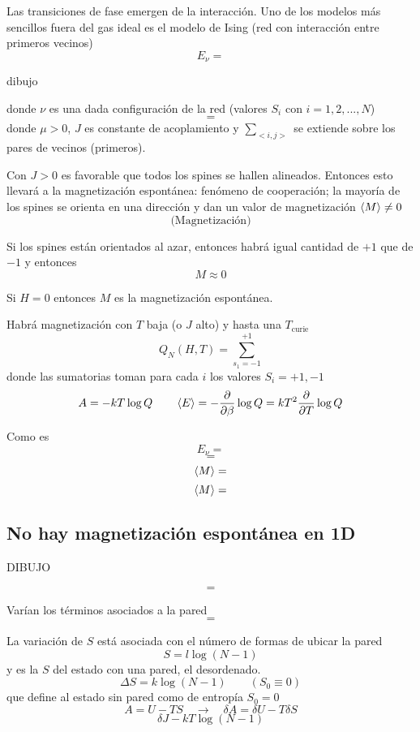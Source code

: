 \documentclass[10pt,oneside]{CBFT_book}
\begin{document}
Las transiciones de fase emergen de la interacción. Uno de los modelos más sencillos fuera del gas ideal es el modelo de
Ising (red con interacción entre primeros vecinos)
\[
	E_\nu =
	\label{energia_ising}
\]

dibujo 

donde $\nu$ es una dada configuración de la red (valores $S_i$ con $i=1,2,...,N$)
\[
	=
\]
donde $\mu>0$, $J$ es constante de acoplamiento y $\sum_{<i,j>}$ se extiende sobre los pares de vecinos (primeros).

Con $J>0$ es favorable que todos los spines se hallen alineados. Entonces esto llevará a la magnetización espontánea: 
fenómeno de cooperación; la mayoría de los spines se orienta en una dirección y dan un valor de magnetización 
$\braket{M} \neq 0$
\[
	\text{ (Magnetización) }
\]

Si los spines están orientados al azar, entonces habrá igual cantidad de $+1$ que de $-1$ y entonces
\[
	M \approx 0
\]

Si $H=0$ entonces $M$ es la magnetización espontánea.

Habrá magnetización con $T$ baja (o $J$ alto) y hasta una $T_\text{curie}$
\[
	Q_N(H,T) = \sum_{s_1=-1}^{+1} 
\]
donde las sumatorias toman para cada $i$ los valores $S_i = +1, -1$
\[
	A = -kT\log Q \qquad \braket{E} = -\frac{\partial^{\hspace{-0.05em}} {}}{\partial {\beta}^{\hspace{-0.05em}}}\log Q = kT^2 \frac{\partial^{\hspace{-0.05em}} {}}{\partial {T}^{\hspace{-0.05em}}} \log Q
\]

Como es
\[
	E_\nu =
\]
\[
	=
\]
\[
	\braket{M} = 
\]
\[
	\braket{M} = 
\]

\subsection{No hay magnetización espontánea en 1D}

DIBUJO 

\[
	=
\]

Varían los términos asociados a la pared
\[
	=
\]

La variación de $S$ está asociada con el número de formas de ubicar la pared
\[
	S = l \log (N-1)
\]
y es la $S$ del estado con una pared, el desordenado.
\[
	\Delta S = k \log(N-1)	\qquad (S_0 \equiv 0)
\]
que define al estado sin pared como de entropía $S_0=0$
\[
	A = U - TS \quad \rightarrow \quad \delta A = \delta U - T \delta S
\]
\[
	\delta J - kT \log(N-1)
\]
\end{document}
